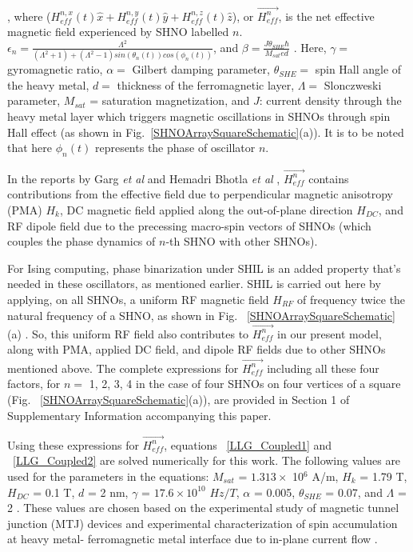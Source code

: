 \documentclass[10pt]{article}
\begin{document}
, where ($H_{eff}^{n,x}(t)\hat{x}+H_{eff}^{n,y}(t)\hat{y}+ H_{eff}^{n,z}(t)\hat{z}$), or $\vec{H_{eff}^{n}}$, is the net effective magnetic field experienced by SHNO labelled $n$. $\epsilon_n=\frac{\Lambda^2}{(\Lambda^2 + 1)+(\Lambda^2 - 1)sin(\theta_n(t))cos(\phi_n(t))}$, and $\beta= \frac{J\theta_{SHE}\hbar}{M_{sat}ed}$ \cite{Taniguchi}.  Here, $\gamma =$  gyromagnetic ratio, $\alpha =$ Gilbert damping parameter, $\theta_{SHE} =$ spin Hall angle of the heavy metal, $d=$ thickness of the ferromagnetic layer, $\Lambda =$ Slonczweski parameter, $M_{sat}$ = saturation magnetization, and $J$: current density through the heavy metal layer which triggers magnetic oscillations in SHNOs through spin Hall effect (as shown in Fig.~\ref{SHNOArraySquareSchematic}(a)). It is to be noted that here $\phi_n(t)$ represents the phase of oscillator $n$. 
 
In the reports by Garg \textit{et al} \cite{Spin_DB1} and Hemadri Bhotla \textit{et al} \cite{Spin_DB2}, $\vec{H_{eff}^{n}}$ contains contributions from the effective field due to perpendicular magnetic anisotropy (PMA) $H_k$, DC magnetic field applied along the out-of-plane direction $H_{DC}$, and RF dipole field due to the precessing macro-spin vectors of SHNOs (which couples the phase dynamics of $n$-th SHNO with other SHNOs). 



For Ising computing, phase binarization under SHIL is an added property that's needed in these oscillators, as mentioned earlier. SHIL is carried out here by applying, on all SHNOs, a uniform RF magnetic field $H_{RF}$ of frequency twice the natural frequency of a SHNO, as shown in Fig. ~\ref{SHNOArraySquareSchematic} (a) \cite{Jaijeet1,Jaijeet2}. So, this uniform RF field also contributes to $\vec{H_{eff}^{n}}$ in our present model, along with PMA, applied DC field, and dipole RF fields due to other SHNOs mentioned above. The complete expressions for $\vec{H_{eff}^{n}}$ including all these four factors, for $n=$ 1, 2, 3, 4 in the case of four SHNOs on four vertices of a square (Fig. ~\ref{SHNOArraySquareSchematic}(a)), are provided in Section 1 of Supplementary Information accompanying this paper.  


Using these expressions for $\vec{H_{eff}^{n}}$, equations ~\ref{LLG_Coupled1} and ~\ref{LLG_Coupled2} are solved numerically for this work. The following values are used for the parameters in the equations: 
$M_{sat}$ = $1.313\times$ 10$^6$ A/m, $H_k$ = 1.79 T, $H_{DC}$ = 0.1 T, $d$ = 2 nm, $\gamma$ = $17.6 \times 10^{10}$ $Hz/T$, $\alpha$ = 0.005, $\theta_{SHE}$  = 0.07, and $\Lambda$  = 2 \cite{Spin_DB1,Spin_DB2,Taniguchi}. These values are chosen based on the experimental study of magnetic tunnel junction (MTJ) devices and experimental characterization of spin accumulation at heavy metal- ferromagnetic metal interface due to in-plane current flow  \cite{Taniguchi_Expt1,Taniguchi_Expt2, Taniguchi_Expt3, SHE_Pt_1,SHE_Pt_2}. 
\end{document}
